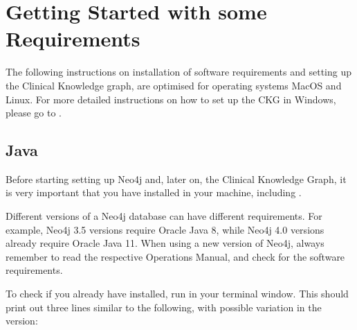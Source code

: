 \documentclass[letterpaper,10pt,english]{sphinxmanual}
\begin{document}
\section{Getting Started with some Requirements}
\label{\detokenize{intro/getting-started-with-requirements:getting-started-with-some-requirements}}\label{\detokenize{intro/getting-started-with-requirements::doc}}
The following instructions on installation of software requirements and setting up the Clinical Knowledge graph, are optimised for operating systems MacOS and Linux. For more detailed instructions on how to set up the CKG in Windows, please go to {\hyperref[\detokenize{intro/getting-started-with-windows:windows-installation}]{}}.


\subsection{Java}
\label{\detokenize{intro/getting-started-with-requirements:java}}
Before starting setting up Neo4j and, later on, the Clinical Knowledge Graph, it is very important that you have  installed in your machine, including .

Different versions of a Neo4j database can have different requirements. For example, Neo4j 3.5 versions require Oracle Java 8, while Neo4j 4.0 versions already require Oracle Java 11.
When using a new version of Neo4j, always remember to read the respective Operations Manual, and check for the software requirements.

To check if you already have  installed, run  in your terminal window. This should print out three lines similar to the following, with possible variation in the version:

\begin{sphinxVerbatim}[commandchars=\\\{\}]
  
     
        
\end{sphinxVerbatim}
\end{document}
